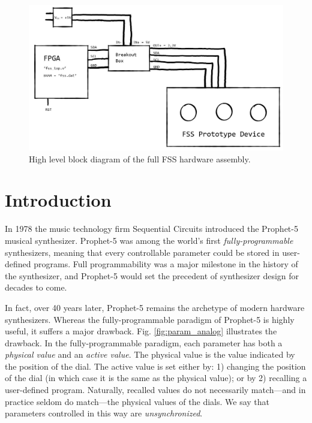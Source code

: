 \documentclass[conference]{IEEEtran}
\begin{document}
\begin{figure}[bhtp]
    \centering
    \includegraphics[scale=0.6]{./resources/figures/full_assembly_block_diagram.jpg}
    \caption{High level block diagram of the full FSS hardware assembly.}
    \label{fig:full_fss_block_diagram}
\end{figure}

\section{Introduction}

In 1978 the music technology firm Sequential Circuits introduced the Prophet-5 musical synthesizer. Prophet-5 was among the world’s first \textit{fully-programmable} synthesizers, meaning that every controllable parameter could be stored in user-defined programs. Full programmability was a major milestone in the history of the synthesizer, and Prophet-5 would set the precedent of synthesizer design for decades to come.

In fact, over 40 years later, Prophet-5 remains the archetype of modern hardware synthesizers. Whereas the fully-programmable paradigm of Prophet-5 is highly useful, it suffers a major drawback. Fig. \ref{fig:param_analog} illustrates the drawback. In the fully-programmable paradigm, each parameter has both a \textit{physical value} and an \textit{active value}. The physical value is the value indicated by the position of the dial. The active value is set either by: 1) changing the position of the dial (in which case it is the same as the physical value); or by 2) recalling a user-defined program. Naturally, recalled values do not necessarily match—and in practice seldom do match—the physical values of the dials. We say that parameters controlled in this way are \textit{unsynchronized}.
\end{document}
